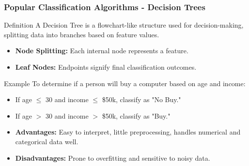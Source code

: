 \documentclass[aspectratio=169]{beamer}
\begin{document}
\begin{frame}[fragile]
    \frametitle{Popular Classification Algorithms - Decision Trees}
    \begin{block}{Definition}
        A Decision Tree is a flowchart-like structure used for decision-making, splitting data into branches based on feature values.
    \end{block}
    
    \begin{itemize}
        \item \textbf{Node Splitting:} Each internal node represents a feature.
        \item \textbf{Leaf Nodes:} Endpoints signify final classification outcomes.
    \end{itemize}

    \begin{block}{Example}
        To determine if a person will buy a computer based on age and income:
        \begin{itemize}
            \item If age $\leq$ 30 and income $\leq$ \$50k, classify as "No Buy."
            \item If age $>$ 30 and income $>$ \$50k, classify as "Buy."
        \end{itemize}
    \end{block}
    
    \begin{itemize}
        \item \textbf{Advantages:} Easy to interpret, little preprocessing, handles numerical and categorical data well.
        \item \textbf{Disadvantages:} Prone to overfitting and sensitive to noisy data.
    \end{itemize}
\end{frame}
\end{document}
